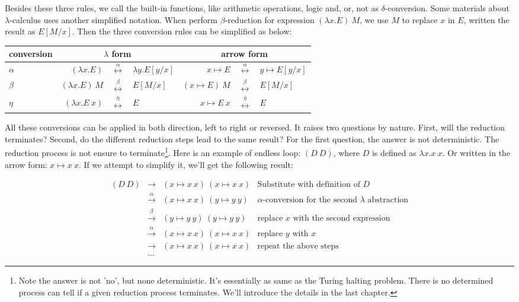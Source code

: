 \documentclass{article}
\begin{document}
Besides these three rules, we call the built-in functions, like arithmetic operations, logic and, or, not as $\delta$-conversion. Some materials about $\lambda$-calculus uses another simplified notation. When perform $\beta$-reduction for expression $(\lambda x. E)\ M$, we use $M$ to replace $x$ in $E$, written the result as $E[M/x]$. Then the three conversion rules can be simplified as below:

\vspace{5mm}
\begin{tabular}{|l|rcl|rcl|}
\hline
conversion & \multicolumn{3}{|c|}{$\lambda$ form} & \multicolumn{3}{|c|}{arrow form} \\
\hline
$\alpha$ & $(\lambda x . E)$ & $\overset{\alpha}{\longleftrightarrow}$ & $\lambda y . E[y/x]$
         & $x \mapsto E$ & $\overset{\alpha}{\longleftrightarrow}$ & $y \mapsto E[y/x]$ \\
\hline
$\beta$  & $(\lambda x . E)\ M$ & $\overset{\beta}{\longleftrightarrow}$ & $E[M/x]$
         & $(x \mapsto E)\ M$ & $\overset{\beta}{\longleftrightarrow}$ & $E[M/x]$ \\
\hline
$\eta$   & $(\lambda x . E\ x)$ & $\overset{\eta}{\longleftrightarrow}$ & $E$
         & $x \mapsto E\ x$ & $\overset{\eta}{\longleftrightarrow}$ & $E$ \\
\hline
\end{tabular}
\vspace{5mm}

All these conversions can be applied in both direction, left to right or reversed. It raises two questions by nature. First, will the reduction terminates? Second, do the different reduction steps lead to the same result? For the first question, the answer is not deterministic. The reduction process is not ensure to terminate\footnote{Note the answer is not 'no', but none deterministic. It's essentially as same as the Turing halting problem. There is no determined process can tell if a given reduction process terminates. We'll introduce the details in the last chapter.}. Here is an example of endless loop: $(D\ D)$, where $D$ is defined as $\lambda x. x\ x$. Or written in the arrow form: $x \mapsto x\ x$. If we attempt to simplify it, we'll get the following result:

\[
\begin{array}{rcll}
(D\ D) & \to & (x \mapsto x\ x)\ (x \mapsto x\ x) & \text{Substitute with definition of $D$} \\
       & \xrightarrow{\alpha} & (x \mapsto x\ x)\ (y \mapsto y\ y) & \text{$\alpha$-conversion for the second $\lambda$ abstraction} \\
       & \xrightarrow{\beta} & (y \mapsto y\ y)\ (y \mapsto y\ y) & \text{replace $x$ with the second expression} \\
       & \xrightarrow{\alpha} & (x \mapsto x\ x)\ (x \mapsto x\ x) & \text{replace $y$ with $x$} \\
       & \to & (x \mapsto x\ x)\ (x \mapsto x\ x) & \text{repeat the above steps} \\
       & ... &
\end{array}
\]
\end{document}
